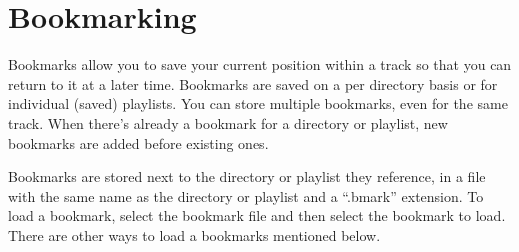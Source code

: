 \section{\label{ref:Bookmarkconfigactual}Bookmarking}
  Bookmarks allow you to save your current position within a track so that 
  you can return to it at a later time.  Bookmarks are saved on a per directory
  basis or for individual (saved) playlists. You can store multiple bookmarks,
  even for the same track. When there's already a bookmark for a directory or
  playlist, new bookmarks are added before existing ones.

  Bookmarks are stored next to the directory or playlist they reference, in a
  file with the same name as the directory or playlist and a ``.bmark''
  extension. To load a bookmark, select the bookmark file and then select
  the bookmark to load. There are other ways to load a bookmarks mentioned
  below.
  

